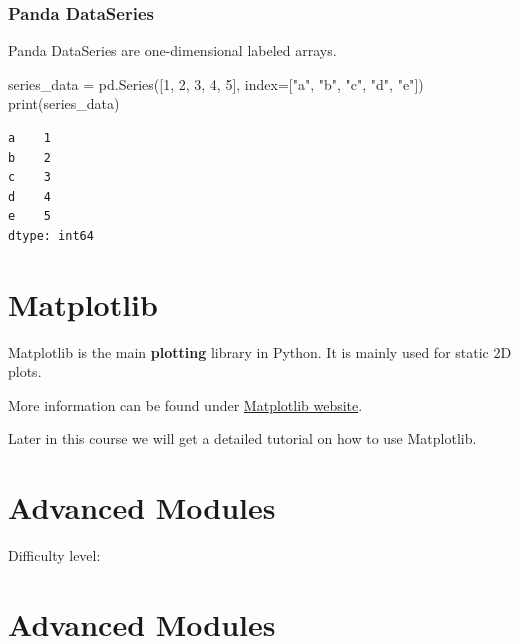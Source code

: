 \documentclass[
  letterpaper,
  DIV=11,
  numbers=noendperiod]{scrreprt}
\newenvironment{Shaded}{\begin{snugshade}}{\end{snugshade}}
\newcommand{\BuiltInTok}[1]{\textcolor[rgb]{0.00,0.23,0.31}{#1}}
\newcommand{\DecValTok}[1]{\textcolor[rgb]{0.68,0.00,0.00}{#1}}
\newcommand{\NormalTok}[1]{\textcolor[rgb]{0.00,0.23,0.31}{#1}}
\newcommand{\OperatorTok}[1]{\textcolor[rgb]{0.37,0.37,0.37}{#1}}
\newcommand{\StringTok}[1]{\textcolor[rgb]{0.13,0.47,0.30}{#1}}
\begin{document}
\subsection*{Panda DataSeries}\label{panda-dataseries}

Panda DataSeries are one-dimensional labeled arrays.

\begin{Shaded}
\begin{Highlighting}[]
\NormalTok{series\_data }\OperatorTok{=}\NormalTok{ pd.Series([}\DecValTok{1}\NormalTok{, }\DecValTok{2}\NormalTok{, }\DecValTok{3}\NormalTok{, }\DecValTok{4}\NormalTok{, }\DecValTok{5}\NormalTok{], index}\OperatorTok{=}\NormalTok{[}\StringTok{"a"}\NormalTok{, }\StringTok{"b"}\NormalTok{, }\StringTok{"c"}\NormalTok{, }\StringTok{"d"}\NormalTok{, }\StringTok{"e"}\NormalTok{])}
\BuiltInTok{print}\NormalTok{(series\_data)}
\end{Highlighting}
\end{Shaded}

\begin{verbatim}
a    1
b    2
c    3
d    4
e    5
dtype: int64
\end{verbatim}

\chapter*{Matplotlib}\label{matplotlib}


Matplotlib is the main \textbf{plotting} library in Python. It is mainly
used for static 2D plots.

More information can be found under
\href{https://matplotlib.org/}{Matplotlib website}.

Later in this course we will get a detailed tutorial on how to use
Matplotlib.

\chapter{Advanced Modules}\label{advanced-modules}

Difficulty level: { }

\chapter*{Advanced Modules}\label{advanced-modules-1}
\end{document}
